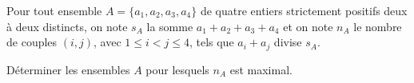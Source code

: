 Pour tout ensemble $A = \{a_1, a_2, a_3, a_4\}$ de quatre entiers strictement positifs deux à deux distincts,
on note $s_A$ la somme $a_1 + a_2 + a_3 + a_4$ et on note $n_A$ le nombre de couples $(i, j)$, avec
$1 \leqslant i < j \leqslant 4$, tels que $a_i + a_j$ divise $s_A$.

Déterminer les ensembles $A$ pour lesquels $n_A$ est maximal.
